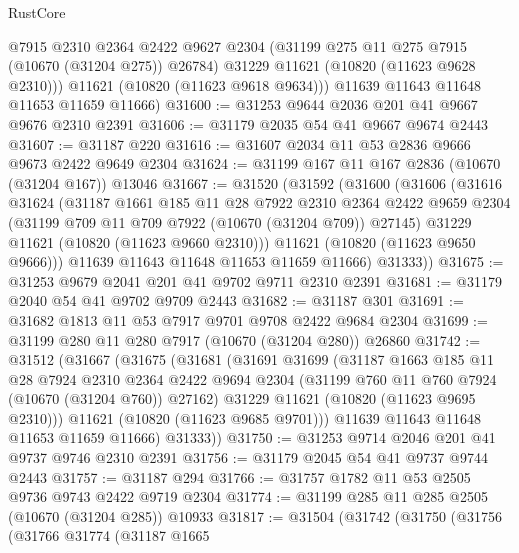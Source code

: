 \begin{lexlean}{RustCore}
\begin{coremodule}
          @7915
          @2310
          @2364
          @2422
          @9627
          @2304
          (@31199 @275 @11 @275 @7915 (@10670 (@31204 @275)) @26784)
          @31229
          @11621
          (@10820 (@11623 @9628 @2310)))
        @11621
        (@10820 (@11623 @9618 @9634)))
      @11639
      @11643
      @11648
      @11653
      @11659
      @11666)
@31600 := @31253 @9644 @2036 @201 @41 @9667 @9676 @2310 @2391
@31606 := @31179 @2035 @54 @41 @9667 @9674 @2443
@31607 := @31187 @220
@31616 := @31607 @2034 @11 @53 @2836 @9666 @9673 @2422 @9649 @2304
@31624 := @31199 @167 @11 @167 @2836 (@10670 (@31204 @167)) @13046
@31667 := @31520
    (@31592
      (@31600
        (@31606
          (@31616
            @31624
            (@31187
              @1661
              @185
              @11
              @28
              @7922
              @2310
              @2364
              @2422
              @9659
              @2304
              (@31199 @709 @11 @709 @7922 (@10670 (@31204 @709)) @27145)
              @31229
              @11621
              (@10820 (@11623 @9660 @2310)))
            @11621
            (@10820 (@11623 @9650 @9666)))
          @11639
          @11643
          @11648
          @11653
          @11659
          @11666)
        @31333))
@31675 := @31253 @9679 @2041 @201 @41 @9702 @9711 @2310 @2391
@31681 := @31179 @2040 @54 @41 @9702 @9709 @2443
@31682 := @31187 @301
@31691 := @31682 @1813 @11 @53 @7917 @9701 @9708 @2422 @9684 @2304
@31699 := @31199 @280 @11 @280 @7917 (@10670 (@31204 @280)) @26860
@31742 := @31512
    (@31667
      (@31675
        (@31681
          (@31691
            @31699
            (@31187
              @1663
              @185
              @11
              @28
              @7924
              @2310
              @2364
              @2422
              @9694
              @2304
              (@31199 @760 @11 @760 @7924 (@10670 (@31204 @760)) @27162)
              @31229
              @11621
              (@10820 (@11623 @9695 @2310)))
            @11621
            (@10820 (@11623 @9685 @9701)))
          @11639
          @11643
          @11648
          @11653
          @11659
          @11666)
        @31333))
@31750 := @31253 @9714 @2046 @201 @41 @9737 @9746 @2310 @2391
@31756 := @31179 @2045 @54 @41 @9737 @9744 @2443
@31757 := @31187 @294
@31766 := @31757 @1782 @11 @53 @2505 @9736 @9743 @2422 @9719 @2304
@31774 := @31199 @285 @11 @285 @2505 (@10670 (@31204 @285)) @10933
@31817 := @31504
    (@31742
      (@31750
        (@31756
          (@31766
            @31774
            (@31187
              @1665

\end{coremodule}
\end{lexlean}
